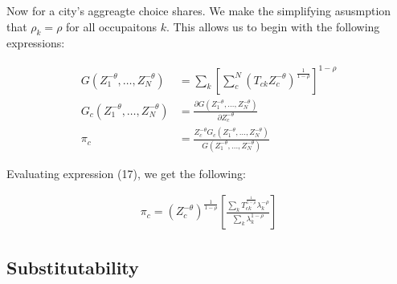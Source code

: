 \documentclass[10pt]{article}
\begin{document}


Now for a city's aggreagte choice shares. We make the simplifying asusmption that $\rho_k = \rho$ for all occupaitons $k$. This allows us to begin with the following expressions:

\begin{align}
    G(Z_1^{-\theta}, \dots, Z_N^{-\theta})   & = \sum_{k}^{}[\sum_{c}^{N}(T_{ck} Z_c^{-\theta})^{\frac{1}{1 - \rho}}]^{1 - \rho}                       \\
    G_c(Z_1^{-\theta}, \dots, Z_N^{-\theta}) & = \frac{\partial G(Z_1^{-\theta}, \dots, Z_N^{-\theta})}{\partial Z_c^{-\theta}}                        \\
    \pi_c                                    & = \frac{Z_c^{-\theta} G_c(Z_1^{-\theta}, \dots, Z_N^{-\theta})}{G(Z_1^{-\theta}, \dots, Z_N^{-\theta})}
\end{align}





Evaluating expression (17), we get the following:

\begin{align}
    \pi_c = (Z_c^{- \theta})^{\frac{1}{1 - \rho}} \left[ \frac{\sum_{k}^{} T_{ck}^{\frac{1}{1 - \rho}} \lambda_k^{- \rho}}{\sum_{k}^{} \lambda_k^{1 - \rho}} \right]
\end{align}

\subsection{Substitutability}
\end{document}
